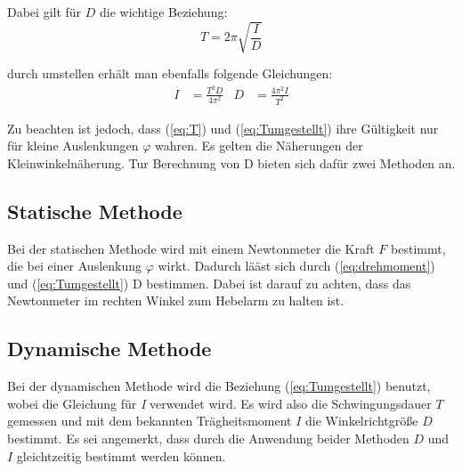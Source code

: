 Dabei gilt für $D$ die wichtige Beziehung:
\begin{equation} \label{eq:T}
    T = 2\pi \sqrt{\frac{I}{D}}
\end{equation}

durch umstellen erhält man ebenfalls folgende Gleichungen:
\begin{align} \label{eq:Tumgestellt}
    I & = \frac{T^2D}{4\pi^2} & D & = \frac{4\pi^2I}{T^2} 
\end{align}

Zu beachten ist jedoch, dass (\ref{eq:T}) und (\ref{eq:Tumgestellt}) ihre Gültigkeit nur für kleine Auslenkungen $\varphi$ wahren.
Es gelten die Näherungen der Kleinwinkelnäherung.
Tur Berechnung von D bieten sich dafür zwei Methoden an.

\subsection*{Statische Methode}
Bei der statischen Methode wird mit einem Newtonmeter die Kraft $F$ bestimmt, die bei einer Auslenkung $\varphi$ wirkt.
Dadurch lääst sich durch (\ref{eq:drehmoment}) und (\ref{eq:Tumgestellt}) D bestimmen.
Dabei ist darauf zu achten, dass das Newtonmeter im rechten Winkel zum Hebelarm zu halten ist.

\subsection*{Dynamische Methode}
Bei der dynamischen Methode wird die Beziehung (\ref{eq:Tumgestellt}) benutzt, wobei die Gleichung für \textit{I} verwendet wird.
Es wird also die Schwingungsdauer $T$ gemessen und mit dem bekannten Trägheitsmoment $I$ die Winkelrichtgröße $D$ bestimmt.
Es sei angemerkt, dass durch die Anwendung beider Methoden $D$ und $I$ gleichtzeitig bestimmt werden können.